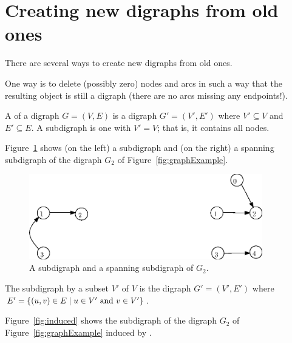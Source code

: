 \section{Creating new digraphs from old ones}

There are several ways to create new digraphs from old ones.

One way is to delete (possibly zero) nodes and arcs in such a way that the 
resulting object is still a digraph (there are no arcs missing any
endpoints!).

\begin{Definition}
A  of a digraph $G = (V, E)$ is a digraph $G' = (V', E')$ 
where $V'\subseteq V$ and $E'\subseteq E$. A  subdigraph 
is one with $V'=V$; that is, it contains all nodes.
\end{Definition}

\begin{Example}
Figure~\ref{fig:sub+span} shows (on the left) a subdigraph and (on the right) 
a spanning subdigraph of the digraph $G_2$ of Figure~\ref{fig:graphExample}.
\end{Example}

\begin{figure}[h]
\begin{center}
\includegraphics[width=4in]{figs/wSub+Span.eps}
\end{center}
\caption{A subdigraph and a spanning subdigraph of $G_2$.}
\label{fig:sub+span}
\end{figure}

\begin{Definition}
The subdigraph  by a subset $V'$ of $V$ is the digraph
$G' = (V', E')$ where $E' = \mbox{$\{(u, v) \in E \mid u \in V' \mbox{ and } v\in V'\}$}$.
\end{Definition}

\begin{Example}
Figure~\ref{fig:induced} shows the subdigraph of the  digraph $G_2$ of Figure~\ref{fig:graphExample} induced by 
.
\end{Example}


